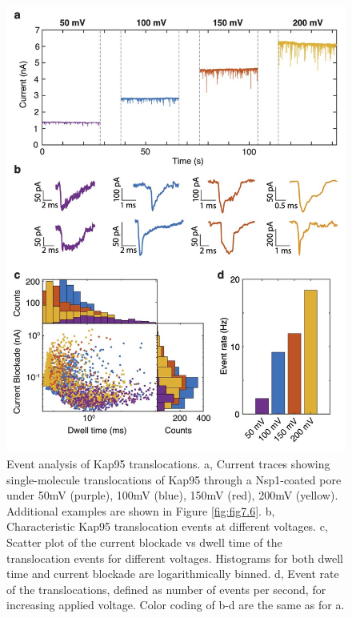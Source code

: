 \begin{figure}[!htbp]
	\centering
	\includegraphics[width=1\linewidth]{figures/Figure7.2}
	\caption{Event analysis of Kap95 translocations. a, Current traces showing single-molecule translocations of Kap95 through a Nsp1-coated pore under 50mV (purple), 100mV (blue), 150mV (red), 200mV (yellow). Additional examples are shown in Figure \ref{fig:fig7.6}. b, Characteristic Kap95 translocation events at different voltages. c, Scatter plot of the current blockade vs dwell time of the translocation events for different voltages. Histograms for both dwell time and current blockade are logarithmically binned. d, Event rate of the translocations, defined as number of events per second, for increasing applied voltage. Color coding of b-d are the same as for a.}
	\label{fig:fig7.2}
\end{figure}

